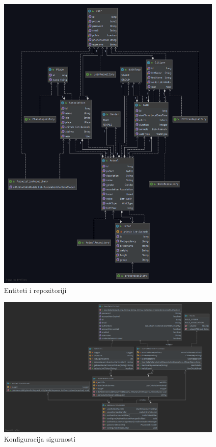 			\begin{figure}[H]
				\includegraphics[width=\linewidth]{slike/Entities-Repositories.png}
				\centering
				\caption{Entiteti i repozitoriji}
				\label{fig:entities-repositories}
			\end{figure}
	
			\begin{figure}[H]
				\includegraphics[width=\linewidth]{slike/Security.png}
				\centering
				\caption{Konfiguracija sigurnosti}
				\label{fig:security}
			\end{figure}
			
